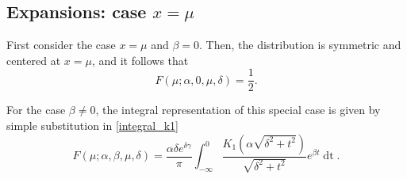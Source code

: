 \documentclass[10pt,a4paper,oneside]{article}
\numberwithin{equation}{section}
\begin{document}
\subsection{Expansions: case $x = \mu$}
First consider the case $x = \mu$ and $\beta = 0$. Then, the distribution is symmetric and centered at $x = \mu$, and it follows that
\begin{equation}
F(\mu; \alpha, 0, \mu, \delta) = \frac{1}{2}.
\end{equation}

For the case $\beta \neq 0$, the integral representation of this special case is given by simple substitution in \eqref{integral_k1}
\begin{equation}\label{integral_k1_x=mu}
F(\mu; \alpha, \beta, \mu, \delta) = \frac{\alpha \delta e^{\delta \gamma}}{\pi} \int_{-\infty}^{0} \frac{K_1\left(\alpha\sqrt{\delta^2 + t^2}\right)}{\sqrt{\delta^2 + t^2}} e^{\beta t} \mathop{dt}.
\end{equation}
\end{document}
